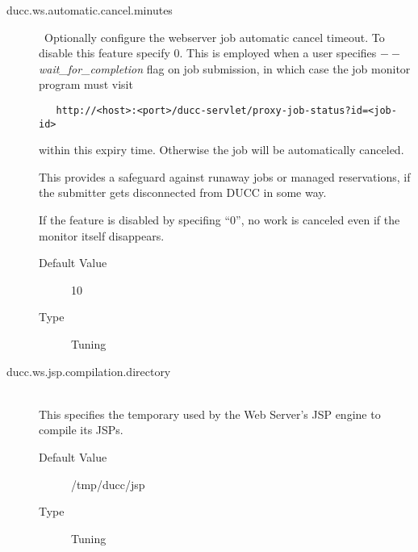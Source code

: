 \begin{description}
        \item[ducc.ws.automatic.cancel.minutes] \hfill \ Optionally configure the webserver job
          automatic cancel timeout. To disable this feature specify 0.  This is employed when a user
          specifies {\em$--$wait\_for\_completion} flag on job submission, in which case the job
          monitor program must visit 
\begin{verbatim}
   http://<host>:<port>/ducc-servlet/proxy-job-status?id=<job-id>
\end{verbatim}
          within this expiry time.  Otherwise the job will be automatically canceled.

          This provides a safeguard against runaway jobs or managed reservations, if the
          submitter gets disconnected from DUCC in some way.

          If the feature is disabled by specifing ``0'', no work is canceled even if the
          monitor itself disappears.

          \begin{description}
            \item[Default Value] 10
            \item[Type] Tuning
          \end{description}

        \item[ducc.ws.jsp.compilation.directory] \hfill \\
          This specifies the temporary used by the Web Server's JSP engine to compile its JSPs.
          \begin{description}
            \item[Default Value] /tmp/ducc/jsp
            \item[Type] Tuning
          \end{description}

      \end{description}  
            
    

